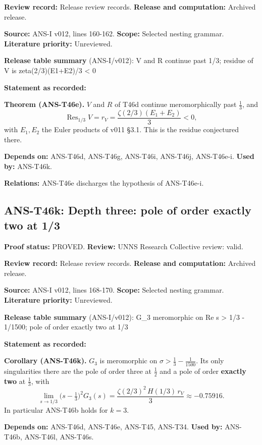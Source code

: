 \documentclass[
  11pt,
]{article}
\begin{document}
\textbf{Review record:} Release review records. \textbf{Release and
computation:} Archived release.

\textbf{Source:} ANS-I v012, lines 160-162. \textbf{Scope:} Selected
nesting grammar. \textbf{Literature priority:} Unreviewed.

\textbf{Release table summary} (ANS-I/v012): V and R continue past 1/3;
residue of V is zeta(2/3)(E1+E2)/3 \textless{} 0

\textbf{Statement as recorded:}

\textbf{Theorem (ANS-T46e).} \(V\) and \(R\) of T46d continue
meromorphically past \(\frac13\), and
\[\operatorname{Res}_{1/3}V=r_V=\frac{\zeta(2/3)(E_1+E_2)}3<0,\] with
\(E_1,E_2\) the Euler products of v011 §3.1. This is the residue
conjectured there.

\textbf{Depends on:} ANS-T46d, ANS-T46g, ANS-T46i, ANS-T46j, ANS-T46e-i.
\textbf{Used by:} ANS-T46k.

\textbf{Relations:} ANS-T46e discharges the hypothesis of ANS-T46e-i.

\hypertarget{ans-t46k-depth-three-pole-of-order-exactly-two-at-13}{%
\subsection{ANS-T46k: Depth three: pole of order exactly two at
1/3}\label{ans-t46k-depth-three-pole-of-order-exactly-two-at-13}}

\textbf{Proof status:} PROVED. \textbf{Review:} UNNS Research Collective
review: valid.

\textbf{Review record:} Release review records. \textbf{Release and
computation:} Archived release.

\textbf{Source:} ANS-I v012, lines 168-170. \textbf{Scope:} Selected
nesting grammar. \textbf{Literature priority:} Unreviewed.

\textbf{Release table summary} (ANS-I/v012): G\_3 meromorphic on Re s
\textgreater{} 1/3 - 1/1500; pole of order exactly two at 1/3

\textbf{Statement as recorded:}

\textbf{Corollary (ANS-T46k).} \(G_3\) is meromorphic on
\(\sigma>\frac13-\frac1{1500}\). Its only singularities there are the
pole of order three at \(\frac12\) and a pole of order \textbf{exactly
two} at \(\frac13\), with
\[\lim_{s\to1/3}\big(s-\tfrac13\big)^2G_3(s)=\frac{\zeta(2/3)^2\,H(1/3)\,r_V}3\approx-0.75916.\]
In particular ANS-T46b holds for \(k=3\).

\textbf{Depends on:} ANS-T46d, ANS-T46e, ANS-T45, ANS-T34. \textbf{Used
by:} ANS-T46b, ANS-T46l, ANS-T46s.
\end{document}
